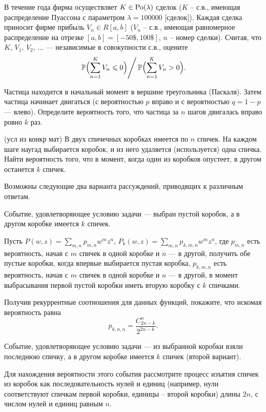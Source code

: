 \begin{problem}
В течение года фирма осуществляет $K\in \mathrm{Po}(\lambda)$ сделок ($K$ -- с.в., имеющая распределение Пуассона с параметром  $\lambda=100000$ 
[сделок]). Каждая сделка приносит фирме прибыль $V_n\in R[a,b]$ ($V_n$ -- с.в., имеющая равномерное распределение на отрезке 
$[a,b]=[-50\$,100\$]$, $n$ -- номер сделки). Считая, что $K$, $V_1$, $V_2$, $\ldots$ --- независимые в совокупности с.в., оцените 
\begin{equation}
\label{ProbRatio}
\left. {\mathbb P}\Bigl(\sum\limits_{n=1}^{K} V_n\leqslant 0\Bigr)\right/{\mathbb P}\Bigl(\sum\limits_{n=1}^{K} V_n>0\Bigr) . 
\end{equation}
\end{problem}


\begin{problem}
Частица находится в начальный момент в вершине треугольника (Паскаля). Затем частица начинает двигаться (с вероятностью $p$ вправо и 
с вероятностью $q = 1-p$ --- влево). Определите вероятность того, что частица за $n$ шагов 
двигалась вправо ровно $k$ раз. 
\end{problem}


\begin{problem}(усл из конкр мат)
В двух спичечных коробках имеется по $n$ спичек. На каждом шаге наугад выбирается коробок, и из него удаляется (используется) 
одна спичка. Найти вероятность того, что в момент, когда один из коробков опустеет, в другом останется $k$ спичек. 
\end{problem}

\begin{ordre}

Возможны следующие два варианта рассуждений, приводящих к различным ответам.

Событие, удовлетворяющее условию задачи --- выбран пустой коробок, а в другом коробке имеется $k$ спичек. 


Пусть $P(w,z)=\sum\limits_{m,n} p_{m,n} w^m z^n$, 
$P_k(w,z)=\sum\limits_{m,n} p_{k,m,n} w^m z^n$,
где $p_{m,n}$ есть вероятность, начав с $m$ спичек в одной коробке и $n$ --- в другой, получить обе пустые коробки, 
когда впервые выбирается пустая коробка, 
$p_{k,m,n}$ есть вероятность, начав с $m$ спичек в одной коробке и $n$ --- в другой, в момент выбрасывания  первой пустой коробки иметь вторую коробку с $k$ спичками. 

Получив рекуррентные соотношения для данных функций, покажите, что искомая вероятность равна 
$$
p_{k,n,n}=\frac{C_{2n-k}^n}{2^{2n-k}} . 
$$


Событие, удовлетворяющее условию задачи --- из выбранной коробки взяли последнюю спичку, а в другом коробке имеется $k$ спичек (второй вариант). 

Для нахождения вероятности этого события рассмотрите процесс изъятия спичек из коробок как последовательность нулей и единиц (например, нули соответствуют спичкам первой коробки, 
единицы -- второй коробки) длины $2n$, с числом нулей и единиц равным $n$. 
\end{ordre}

